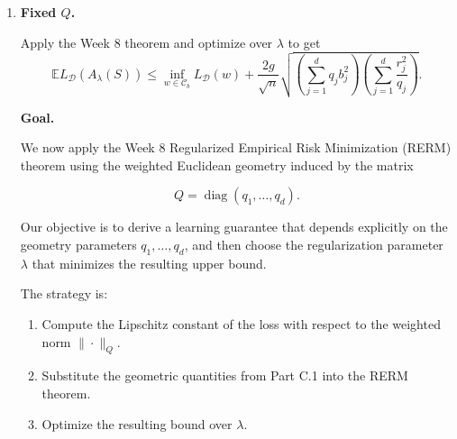 \documentclass[11pt]{article}
\newcommand{\E}{\mathbb{E}}
\begin{document}
\begin{enumerate}
\begin{solutionbox}
\[
\boxed{
\sup_{w\in\mathcal C_b}
\Psi_Q(w)
=
\frac12
\sum_{j=1}^{d}
q_jb_j^2.
}
\]

\medskip

\textbf{Summary.}

The two geometric quantities needed for the weighted-geometry RERM analysis are

\[
\boxed{
\|\varphi(x)\|_{Q,*}^2
\le
\sum_{j=1}^{d}
\frac{r_j^2}{q_j}
}
\]

and

\[
\boxed{
\sup_{w\in\mathcal C_b}
\Psi_Q(w)
=
\frac12
\sum_{j=1}^{d}
q_jb_j^2.
}
\]

The first quantity measures the complexity of the feature map in the dual geometry, while the second measures the size of the comparator class under the weighted regularizer.

\end{solutionbox}

\item \textbf{Fixed $Q$.}

Apply the Week 8 theorem and optimize over $\lambda$ to get
\[
\E L_{\mathcal D}(A_\lambda(S))
\le
\inf_{w\in\mathcal C_b}L_{\mathcal D}(w)
+
\frac{2g}{\sqrt n}
\sqrt{
\left(\sum_{j=1}^dq_jb_j^2\right)
\left(\sum_{j=1}^d\frac{r_j^2}{q_j}\right)
}.
\]

\begin{solutionbox}

\textbf{Goal.}

We now apply the Week 8 Regularized Empirical Risk Minimization (RERM) theorem using the weighted Euclidean geometry induced by the matrix

\[
Q=\operatorname{diag}(q_1,\ldots,q_d).
\]

Our objective is to derive a learning guarantee that depends explicitly on the geometry parameters \(q_1,\ldots,q_d\), and then choose the regularization parameter \(\lambda\) that minimizes the resulting upper bound.

The strategy is:

\begin{enumerate}
    \item Compute the Lipschitz constant of the loss with respect to the weighted norm \(\|\cdot\|_Q\).
    \item Substitute the geometric quantities from Part C.1 into the RERM theorem.
    \item Optimize the resulting bound over \(\lambda\).
\end{enumerate}


\end{solutionbox}
\end{enumerate}
\end{document}
